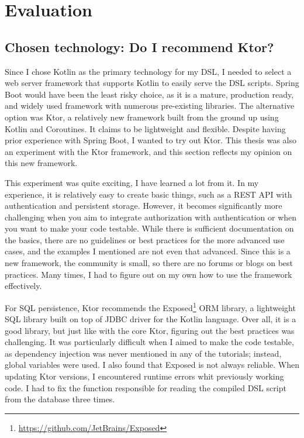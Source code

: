 \section{Evaluation}

\subsection[Chosen technology]{Chosen technology: Do I recommend Ktor?}

Since I chose Kotlin as the primary technology for my DSL, I needed to select a web server framework that supports Kotlin to easily serve the DSL scripts. Spring Boot would have been the least risky choice, as it is a mature, production ready, and widely used framework with numerous pre-existing libraries. The alternative option was Ktor, a relatively new framework built from the ground up using Kotlin and Coroutines. It claims to be lightweight and flexible. Despite having prior experience with Spring Boot, I wanted to try out Ktor. This thesis was also an experiment with the Ktor framework, and this section reflects my opinion on this new framework.

This experiment was quite exciting, I have learned a lot from it. In my experience, it is relatively easy to create basic things, such as a REST API with authentication and persistent storage. However, it becomes significantly more challenging when you aim to integrate authorization with authentication or when you want to make your code testable. While there is sufficient documentation on the basics, there are no guidelines or best practices for the more advanced use cases, and the examples I mentioned are not even that advanced. Since this is a new framework, the community is small, so there are no forums or blogs on best practices. Many times, I had to figure out on my own how to use the framework effectively.

For SQL persistence, Ktor recommends the Exposed\footnote{\url{https://github.com/JetBrains/Exposed}} ORM library, a lightweight SQL library built on top of JDBC driver for the Kotlin language. Over all, it is a good library, but just like with the core Ktor, figuring out the best practices was challenging. It was particularly difficult when I aimed to make the code testable, as dependency injection was never mentioned in any of the tutorials; instead, global variables were used. I also found that Exposed is not always reliable. When updating Ktor versions, I encountered runtime errors whit previously working code. I had to fix the function responsible for reading the compiled DSL script from the database three times.

